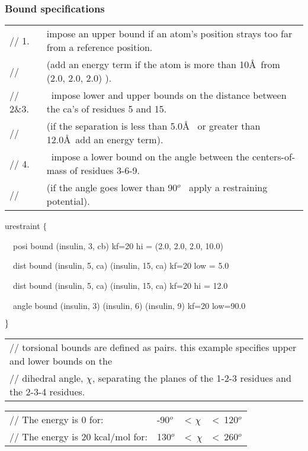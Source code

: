 \subsubsection{Bound specifications}

\begin{tabular}{ll}
{\footnotesize // 1. } & {\footnotesize impose an upper bound if an atom's
position strays too far from a reference position.} \\ 
{\footnotesize // } & {\footnotesize (add an energy term if the atom is more
than 10\AA\ {}from (2.0, 2.0, 2.0) ).} \\ 
{\footnotesize // 2\&3.} & {\footnotesize \ impose lower and upper bounds on
the distance between the ca's of residues 5 and 15.} \\ 
{\footnotesize //} & {\footnotesize (if the separation is less than 5.0\AA\ %
{}or greater than 12.0\AA\ {}add an energy term).} \\ 
{\footnotesize // 4.} & {\footnotesize \ impose a lower bound on the angle
between the centers-of-mass of residues 3-6-9.} \\ 
{\footnotesize //} & {\footnotesize (if the angle goes lower than 90}$^{o}$%
{\footnotesize \ apply a restraining potential).}
\end{tabular}

urestraint $\{$

~~posi bound (insulin, 3, cb) kf=20 hi = (2.0, 2.0, 2.0, 10.0)

~~dist bound (insulin, 5, ca) (insulin, 15, ca) kf=20 low = 5.0

~~dist bound (insulin, 5, ca) (insulin, 15, ca) kf=20 hi = 12.0

~~angle bound (insulin, 3) (insulin, 6) (insulin, 9) kf=20 low=90.0

$\}\bigskip $

\begin{tabular}{l}
{\footnotesize // torsional bounds are defined as pairs. this example
specifies upper and lower bounds on the} \\ 
{\footnotesize // dihedral angle, }$\chi ${\footnotesize {}, separating the
planes of the 1-2-3 residues and the 2-3-4 residues.}
\end{tabular}

\begin{tabular}{llll}
{\footnotesize // The energy is 0 for:} & {\footnotesize -90}$^{o}$ & 
{\footnotesize < }$\chi $ & {\footnotesize <\ 120}$%
^{o}$ \\ 
{\footnotesize // The energy is 20 kcal/mol for:} & {\footnotesize 130}$^{o}$
& {\footnotesize <\ }$\chi $ & {\footnotesize <\
260}$^{o}$%
\end{tabular}

